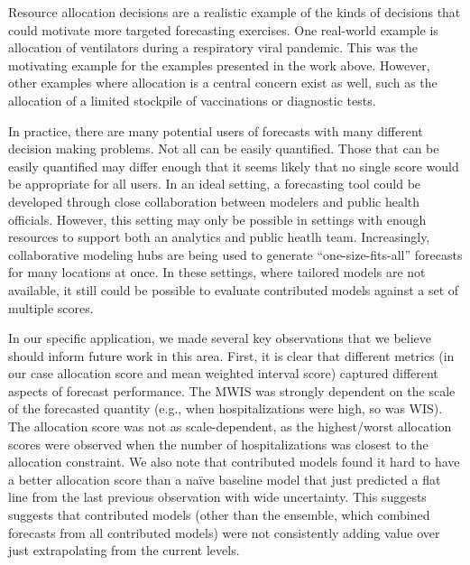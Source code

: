 \documentclass{article}\usepackage[]{graphicx}\usepackage[]{xcolor}
\begin{document}
Resource allocation decisions are a realistic example of the kinds of decisions that could motivate more targeted forecasting exercises.
One real-world example is allocation of ventilators during a respiratory viral pandemic.
This was the motivating example for the examples presented in the work above.
However, other examples where allocation is a central concern exist as well, such as the allocation of a limited stockpile of vaccinations\citep{persad_fair_2023} or diagnostic tests\citep{du_optimal_2022}.

In practice, there are many potential users of forecasts with many different decision making problems.
Not all can be easily quantified.
Those that can be easily quantified may differ enough that it seems likely that no single score would be appropriate for all users.
In an ideal setting, a forecasting tool could be developed through close collaboration between modelers and public health officials.
However, this setting may only be possible in settings with enough resources to support both an analytics and public heatlh team.
Increasingly, collaborative modeling hubs are being used to generate ``one-size-fits-all'' forecasts for many locations at once.
In these settings, where tailored models are not available, it still could be possible to evaluate contributed models against a set of multiple scores.


In our specific application, we made several key observations that we believe should inform future work in this area.
First, it is clear that different metrics (in our case allocation score and mean weighted interval score) captured different aspects of forecast performance.
The MWIS was strongly dependent on the scale of the forecasted quantity (e.g., when hospitalizations were high, so was WIS).
The allocation score was not as scale-dependent, as the highest/worst allocation scores were observed when the number of hospitalizations was closest to the allocation constraint.
We also note that contributed models found it hard to have a better allocation score than a na\"ive baseline model that just predicted a flat line from the last previous observation with wide uncertainty.
This suggests suggests that contributed models (other than the ensemble, which combined forecasts from all contributed models) were not consistently adding value over just extrapolating from the current levels.
\end{document}

